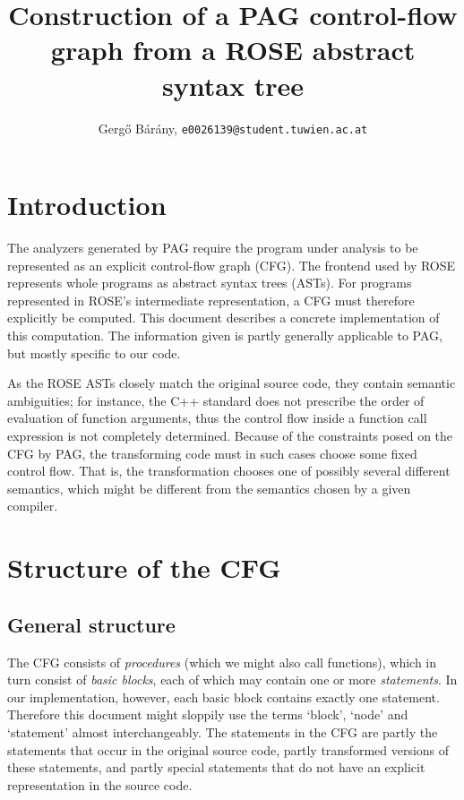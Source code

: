 \documentclass[12pt]{article}
\title{Construction of a PAG control-flow graph from a ROSE abstract
syntax tree}
\author{Gerg\H{o} B\'ar\'any, \texttt{e0026139@student.tuwien.ac.at}}
\begin{document}
\maketitle
\lstset{language=C++}

\section{Introduction}

The analyzers generated by PAG require the program under analysis to
be represented as an explicit control-flow graph (CFG). The frontend
used by ROSE represents whole programs as abstract syntax trees
(ASTs). For programs represented in ROSE's intermediate
representation, a CFG must therefore explicitly be computed. This
document describes a concrete implementation of this computation.
The information given is partly generally applicable to PAG, but
mostly specific to our code.

As the ROSE ASTs closely match the original source code, they
contain semantic ambiguities; for instance, the C++ standard does
not prescribe the order of evaluation of function arguments, thus
the control flow inside a function call expression is not completely
determined. Because of the constraints posed on the CFG by PAG, the
transforming code must in such cases choose some fixed control flow.
That is, the transformation chooses one of possibly several
different semantics, which might be different from the semantics
chosen by a given compiler.

\section{Structure of the CFG}

\subsection{General structure}

The CFG consists of \emph{procedures} (which we might also call
functions), which in turn consist of \emph{basic blocks}, each of
which may contain one or more \emph{statements}. In our
implementation, however, each basic block contains exactly one
statement. Therefore this document might sloppily use the terms
`block', `node' and `statement' almost interchangeably. The
statements in the CFG are partly the statements that occur in the
original source code, partly transformed versions of these
statements, and partly special statements that do not have an
explicit representation in the source code.
\end{document}
